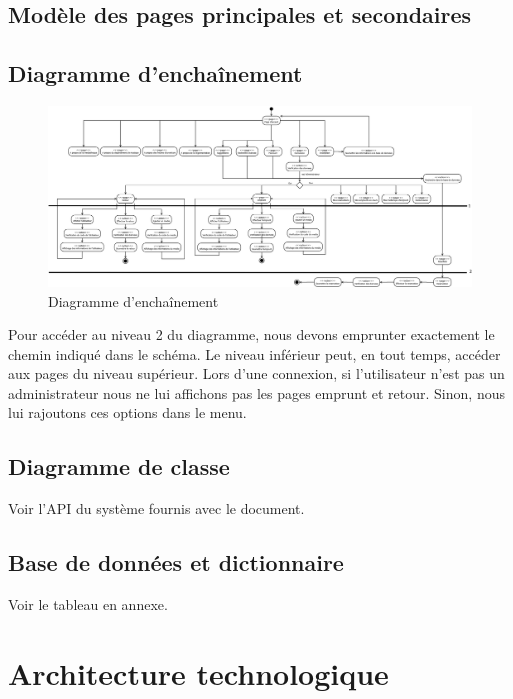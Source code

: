 \documentclass[letter, 11pt]{report}
\begin{document}
\section{Modèle des pages principales et secondaires}


\section{Diagramme d'enchaînement}

\begin{figure}[htbp]
	\begin{center}
		\includegraphics[scale=0.135]{diagrammeEnchainement.png}
	\end{center}
	\caption{Diagramme d'enchaînement}
\end{figure}

Pour accéder au niveau 2 du diagramme, nous devons emprunter exactement le chemin indiqué dans le schéma. Le niveau inférieur peut, en tout temps, accéder aux pages du niveau supérieur.
Lors d'une connexion, si l'utilisateur n'est pas un administrateur nous ne lui affichons pas les pages emprunt et retour. Sinon, nous lui rajoutons ces options dans le menu.

\section{Diagramme de classe}

Voir l'API du système fournis avec le document.

\section{Base de données et dictionnaire}

Voir le tableau en annexe.

\chapter{Architecture technologique}
\end{document}
